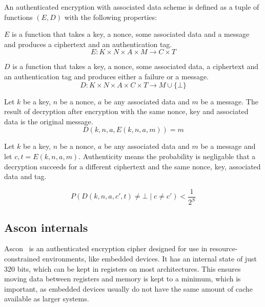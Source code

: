An authenticated encryption with associated data scheme is defined as a tuple of
functions $(E, D)$ with the following properties:

$E$ is a function that takes a key, a nonce, some associated data and a message
and produces a ciphertext and an authentication tag.
\begin{equation}
    E \colon K \times N \times A \times M \to C \times T
\end{equation}

$D$ is a function that takes a key, a nonce, some associated data, a ciphertext
and an authentication tag and produces either a failure or a message.
\begin{equation}
    D \colon K \times N \times A \times C \times T \to M \cup \{ \bot \}
\end{equation}

Let $k$ be a key, $n$ be a nonce, $a$ be any associated data and $m$ be a
message. The result of decryption after encryption with the same nonce, key and
associated data is the original message.
\begin{equation}
    D(k, n, a, E(k, n, a, m)) = m
\end{equation}


Let $k$ be a key, $n$ be a nonce, $a$ be any associated data and $m$ be a
message and let $c, t = E(k, n, a, m)$. Authenticity means the probability is
negligable that a decryption succeeds for a different ciphertext and the same
nonce, key, associated data and tag.

\begin{equation}
    P(D(k, n, a, c', t) \neq \bot \mid c \neq c') < \frac{1}{2^S}
\end{equation}

\subsection{Ascon internals}

Ascon~\cite{ascon} is an authenticated encryption cipher designed for use in
resource-constrained environments, like embedded devices. It has an internal
state of just 320 bits, which can be kept in registers on most architectures.
This ensures moving data between registers and memory is kept to a minimum,
which is important, as embedded devices usually do not have the same amount of
cache available as larger systems.

